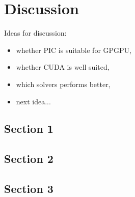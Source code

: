 \chapter{Discussion}
Ideas for discussion:
\begin{itemize}
	\item whether PIC is suitable for GPGPU,
	\item whether CUDA is well suited,
	\item which solvers performs better,
	\item next idea...
\end{itemize}

\section{Section 1}
\section{Section 2}
\section{Section 3}